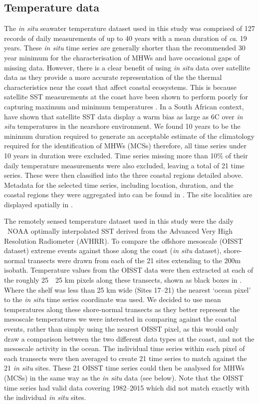 \documentclass[a4paper,10pt,review]{elsarticle}
\begin{document}
\subsection{Temperature data}
The \emph{in situ} seawater temperature dataset used in this study was comprised of 127 records of daily measurements of up to 40 years with a mean duration of \emph{ca}. 19 years. These \emph{in situ} time series are generally shorter than the recommended 30 year minimum for the characterisation of MHWs \citep{Hobday2016} and have occasional gaps of missing data. However, there is a clear benefit of using \emph{in situ} data over satellite data as they provide a more accurate representation of the the thermal characteristics near the coast that affect coastal ecosystems. This is because satellite SST measurements at the coast have been shown to perform poorly for capturing maximum and minimum temperatures \citep[e.g.][]{Smale2009, Castillo2010}. In a South African context, \citet{Smit2013} have shown that satellite SST data display a warm bias as large as 6\degree C over \emph{in situ} temperatures in the nearshore environment. We found 10 years to be the minimum duration required to generate an acceptable estimate of the climatology required for the identification of MHWs (MCSs) therefore, all time series under 10 years in duration were excluded. Time series missing more than 10\% of their daily temperature measurements were also excluded, leaving a total of 21 time series. These were then classified into the three coastal regions detailed above. Metadata for the selected time series, including location, duration, and the coastal regions they were aggregated into can be found in . The site localities are displayed spatially in .

The remotely sensed temperature dataset used in this study were the daily \degree~NOAA optimally interpolated SST \citep[OISST;][]{Reynolds2007} derived from the Advanced Very High Resolution Radiometer (AVHRR). To compare the offshore mesoscale (OISST dataset) extreme events against those along the coast (\emph{in situ} dataset), shore-normal transects were drawn from each of the 21 sites extending to the 200m isobath. Temperature values from the OISST data were then extracted at each of the roughly 25~\texttimes~25 km pixels along these transects, shown as black boxes in . Where the shelf was less than 25 km wide (Sites 17--21) the nearest `ocean pixel' to the \emph{in situ} time series coordinate was used. We decided to use mean temperatures along these shore-normal transects as they better represent the mesoscale temperatures we were interested in comparing against the coastal events, rather than simply using the nearest OISST pixel, as this would only draw a comparison between the two different data types at the coast, and not the mesoscale activity in the ocean. The individual time series within each pixel of each transects were then averaged to create 21 time series to match against the 21 \emph{in situ} sites. These 21 OISST time series could then be analysed for MHWs (MCSs) in the same way as the \emph{in situ} data (see below). Note that the OISST time series had valid data covering 1982--2015 which did not match exactly with the individual \emph{in situ} sites.
\end{document}
